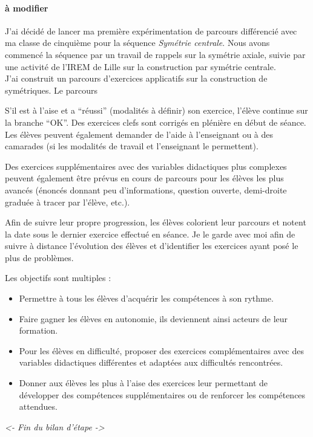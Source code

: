 \paragraph{à modifier}
J'ai décidé de lancer ma première expérimentation de parcours différencié avec ma classe de cinquième pour la séquence \emph{Symétrie centrale}. Nous avons commencé la séquence par un travail de rappels sur la symétrie axiale, suivie par une activité de l'IREM de Lille sur la construction par symétrie centrale.\\
J'ai construit un parcours d'exercices applicatifs sur la construction de symétriques. Le parcours  

S’il est à l’aise et a “réussi” (modalités à définir) son exercice, l’élève continue sur la branche “OK”. Des exercices clefs sont corrigés en plénière en début de séance. Les élèves peuvent également demander de l’aide à l’enseignant ou à des camarades (si les modalités de travail et l’enseignant le permettent).

Des exercices supplémentaires avec des variables didactiques plus complexes peuvent également être prévus en cours de parcours pour les élèves les plus avancés (énoncés donnant peu d’informations, question ouverte, demi-droite graduée à tracer par l’élève, etc.).

Afin de suivre leur propre progression, les élèves colorient leur parcours et notent la date sous le dernier exercice effectué en séance. Je le garde avec moi afin de suivre à distance l’évolution des élèves et d’identifier les exercices ayant posé le plus de problèmes.

Les objectifs sont multiples : 
\begin{itemize}
    \item Permettre à tous les élèves d’acquérir les compétences à son rythme.
    \item Faire gagner les élèves en autonomie, ils deviennent ainsi acteurs de leur formation. 
    \item Pour les élèves en difficulté, proposer des exercices complémentaires avec des variables didactiques différentes et adaptées aux difficultés rencontrées.
    \item Donner aux élèves les plus à l’aise des exercices leur permettant de développer des compétences supplémentaires ou de renforcer les compétences attendues.
\end{itemize}

\textit{<- Fin du bilan d'étape ->}